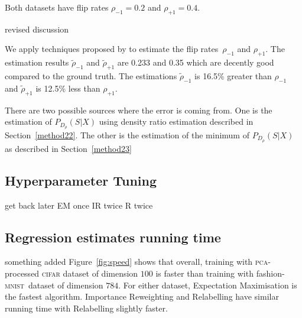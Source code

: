 \documentclass[12pt]{article} %
\newcommand{\rhoo}{\rho_{+1}}
\newcommand{\rhoz}{\rho_{-1}}
\newcommand{\mnist}{fashion-\textsc{mnist}\ }
\begin{document}
Both datasets have flip rates $\rhoz=0.2$ and $\rhoo=0.4$.

{\color{red} revised discussion}

We apply techniques proposed by \citet{liu2016classification} to estimate the flip rates~$\rhoz$ and $\rhoo$. The estimation results $\tilde{\rho}_{-1}$ and $\tilde{\rho}_{+1}$ are 0.233 and 0.35 which are decently good compared to the ground truth.
The estimations $\tilde{\rho}_{-1}$ is 16.5\% greater than $\rhoz$ and $\tilde{\rho}_{+1}$ is 12.5\% less than $\rhoo$.

There are two possible sources where the error is coming from.
One is the estimation of $P_{D_\rho}(S|X)$ using density ratio estimation described in Section~\ref{method22}. 
The other is the estimation of the minimum of $P_{D_\rho}(S|X)$ as described in Section~\ref{method23}


\subsection{Hyperparameter Tuning}
{\color{red} get back later}
EM once
IR twice
R twice


\subsection{Regression estimates running time}
{\color{red} something added}
Figure~\ref{fig:speed} shows that overall, training with \textsc{pca}-processed \textsc{cifar} dataset of dimension $100$ is faster than training with \mnist dataset of dimension $784$. 
For either dataset, Expectation Maximisation is the fastest algorithm. Importance Reweighting and Relabelling have similar running time with Relabelling slightly faster.
\end{document}
